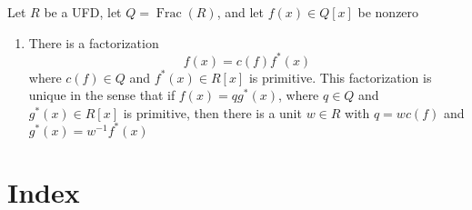 \documentclass[11pt]{article}
\DeclareMathOperator{\Frac}{Frac}
\begin{document}
\begin{lemma}[]
Let \(R\) be a UFD, let \(Q=\Frac(R)\), and let \(f(x)\in Q[x]\) be nonzero
\begin{enumerate}
\item There is a factorization
\begin{equation*}
f(x)=c(f)f^*(x)
\end{equation*}
where \(c(f)\in Q\) and \(f^*(x)\in R[x]\) is primitive. This
factorization is unique in the sense that if \(f(x)=qg^*(x)\), where
\(q\in Q\) and \(g^*(x)\in R[x]\) is primitive, then there is a unit 
\(w\in R\) with \(q=wc(f)\) and \(g^*(x)=w^{-1}f^*(x)\)
\end{enumerate}
\end{lemma}






\section{Index}
\label{sec:org453534e}
\renewcommand{\indexname}{}
\printindex
\end{document}
